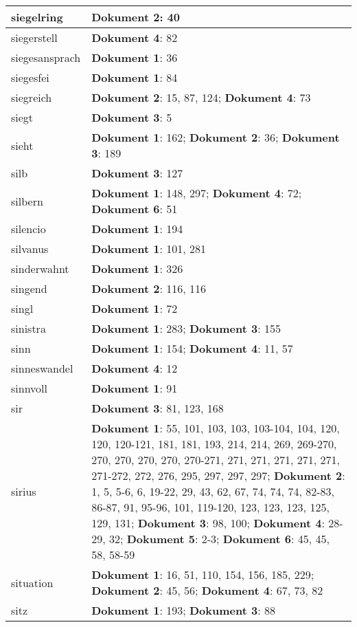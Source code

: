 \documentclass[a5paper]{article}
\begin{document}
\begin{longtable}[l]{|l|p{3in}|}
\hline
siegelring & \textbf{Dokument 2}: 40 \\
\hline
siegerstell & \textbf{Dokument 4}: 82 \\
\hline
siegesansprach & \textbf{Dokument 1}: 36 \\
\hline
siegesfei & \textbf{Dokument 1}: 84 \\
\hline
siegreich & \textbf{Dokument 2}: 15, 87, 124; \textbf{Dokument 4}: 73 \\
\hline
siegt & \textbf{Dokument 3}: 5 \\
\hline
sieht & \textbf{Dokument 1}: 162; \textbf{Dokument 2}: 36; \textbf{Dokument 3}: 189 \\
\hline
silb & \textbf{Dokument 3}: 127 \\
\hline
silbern & \textbf{Dokument 1}: 148, 297; \textbf{Dokument 4}: 72; \textbf{Dokument 6}: 51 \\
\hline
silencio & \textbf{Dokument 1}: 194 \\
\hline
silvanus & \textbf{Dokument 1}: 101, 281 \\
\hline
sinderwahnt & \textbf{Dokument 1}: 326 \\
\hline
singend & \textbf{Dokument 2}: 116, 116 \\
\hline
singl & \textbf{Dokument 1}: 72 \\
\hline
sinistra & \textbf{Dokument 1}: 283; \textbf{Dokument 3}: 155 \\
\hline
sinn & \textbf{Dokument 1}: 154; \textbf{Dokument 4}: 11, 57 \\
\hline
sinneswandel & \textbf{Dokument 4}: 12 \\
\hline
sinnvoll & \textbf{Dokument 1}: 91 \\
\hline
sir & \textbf{Dokument 3}: 81, 123, 168 \\
\hline
sirius & \textbf{Dokument 1}: 55, 101, 103, 103, 103-104, 104, 120, 120, 120-121, 181, 181, 193, 214, 214, 269, 269-270, 270, 270, 270, 270, 270-271, 271, 271, 271, 271, 271, 271-272, 272, 276, 295, 297, 297, 297; \textbf{Dokument 2}: 1, 5, 5-6, 6, 19-22, 29, 43, 62, 67, 74, 74, 74, 82-83, 86-87, 91, 95-96, 101, 119-120, 123, 123, 123, 125, 129, 131; \textbf{Dokument 3}: 98, 100; \textbf{Dokument 4}: 28-29, 32; \textbf{Dokument 5}: 2-3; \textbf{Dokument 6}: 45, 45, 58, 58-59 \\
\hline
situation & \textbf{Dokument 1}: 16, 51, 110, 154, 156, 185, 229; \textbf{Dokument 2}: 45, 56; \textbf{Dokument 4}: 67, 73, 82 \\
\hline
sitz & \textbf{Dokument 1}: 193; \textbf{Dokument 3}: 88 \\

\end{longtable}
\end{document}
